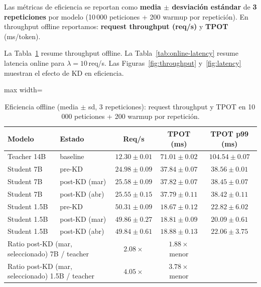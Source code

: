 \documentclass[11pt,a4paper]{article}
\begin{document}
Las m\'etricas de eficiencia se reportan como \textbf{media $\pm$ desviaci\'on
est\'andar} de \textbf{3 repeticiones} por modelo
(10\,000 peticiones + 200 warmup por repetici\'on). En throughput offline reportamos:
\textbf{request throughput (req/s)} y \textbf{TPOT} (ms/token).

La Tabla~\ref{tab:throughput-baselines} resume throughput offline.
La Tabla~\ref{tab:online-latency} resume latencia online para
$\lambda=10$\,req/s. Las Figuras~\ref{fig:throughput}
y~\ref{fig:latency} muestran el efecto de KD en eficiencia.

\begin{table}[H]
\centering
\caption{Eficiencia offline (media $\pm$ sd, 3 repeticiones): request throughput
         y TPOT en 10\,000 peticiones + 200 warmup por repetici\'on.}
\label{tab:throughput-baselines}
\begin{adjustbox}{max width=\textwidth}
\begin{tabular}{llccc}
\toprule
\textbf{Modelo} & \textbf{Estado} & \textbf{Req/s} & \textbf{TPOT (ms)} & \textbf{TPOT p99 (ms)} \\
\midrule
Teacher 14B  & baseline & $12.30 \pm 0.01$ & $71.01 \pm 0.02$ & $104.54 \pm 0.07$ \\
\midrule
Student 7B   & pre-KD        & $24.98 \pm 0.09$ & $37.84 \pm 0.07$ & $38.56 \pm 0.01$ \\
Student 7B   & post-KD (mar) & $25.58 \pm 0.09$ & $37.82 \pm 0.07$ & $38.45 \pm 0.07$ \\
Student 7B   & post-KD (abr) & $25.55 \pm 0.15$ & $37.79 \pm 0.11$ & $38.42 \pm 0.11$ \\
\midrule
Student 1.5B & pre-KD        & $50.31 \pm 0.09$ & $18.67 \pm 0.12$ & $22.82 \pm 6.02$ \\
Student 1.5B & post-KD (mar) & $49.86 \pm 0.27$ & $18.81 \pm 0.09$ & $20.09 \pm 0.61$ \\
Student 1.5B & post-KD (abr) & $49.84 \pm 0.61$ & $18.88 \pm 0.13$ & $22.06 \pm 3.75$ \\
\midrule
\multicolumn{2}{l}{\footnotesize Ratio post-KD (mar, seleccionado) 7B / teacher}
  & $2.08\times$ & $1.88\times$ menor & \\
\multicolumn{2}{l}{\footnotesize Ratio post-KD (mar, seleccionado) 1.5B / teacher}
  & $4.05\times$ & $3.78\times$ menor & \\
\bottomrule
\end{tabular}
\end{adjustbox}
\end{table}
\end{document}
